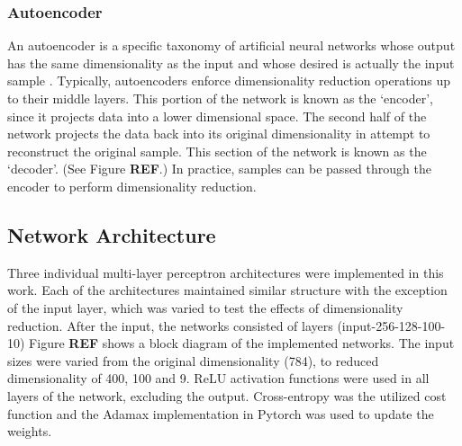 \documentclass[conference]{IEEEtran}
\begin{document}
	\subsubsection*{Autoencoder} An autoencoder is a specific taxonomy of artificial neural networks whose output has the same dimensionality as the input and whose desired is actually the input sample \cite{Haykin2009NeuralNetworks,Goodfellow2016DeepLearning}. Typically, autoencoders enforce dimensionality reduction operations up to their middle layers.  This portion of the network is known as the `encoder', since it projects data into a lower dimensional space.  The second half of the network projects the data back into its original dimensionality in attempt to reconstruct the original sample.  This section of the network is known as the `decoder'. (See Figure \textbf{REF}.)  In practice, samples can be passed through the encoder to perform dimensionality reduction. 
	 
	\subsection{Network Architecture}
	Three individual multi-layer perceptron architectures were implemented in this work.  Each of the architectures maintained similar structure with the exception of the input layer, which was varied to test the effects of dimensionality reduction.  After the input, the networks consisted of layers (input-256-128-100-10) Figure \textbf{REF} shows a block diagram of the implemented networks.   The input sizes were varied from the original dimensionality (784), to reduced dimensionality of 400, 100 and 9.  ReLU activation functions were used in all layers of the network, excluding the output.  Cross-entropy was the utilized cost function and the Adamax implementation in Pytorch was used to update the weights.	
	
	
\end{document}
